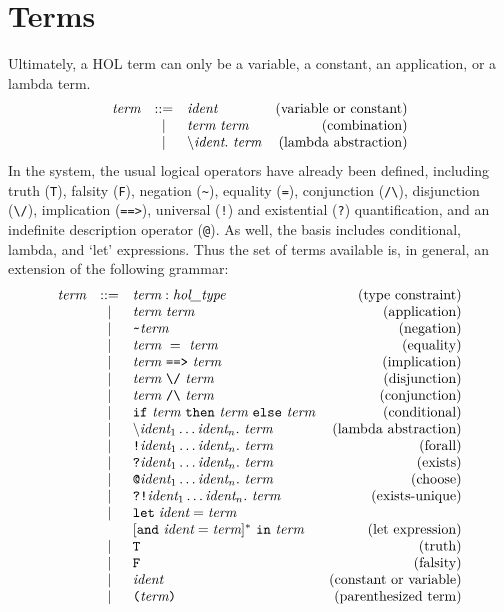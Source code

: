 \documentclass[12pt,fleqn,a4paper]{report}
\makeatletter
\newcommand{\ident}      {\mbox{\it ident}}
\newcommand{\type}       {\mbox{\it hol\_type}}
\newcommand{\term}       {\mbox{\it term}}
\newcommand{\bs}         {\mbox{$\backslash$}}
\newcommand{\IMP}       {\mbox{\tt ==>}}
\newcommand{\LET}       {\mbox{\tt let}}
\newcommand{\IN}       {\mbox{\tt in}}
\newcommand{\und}       {\mbox{\tt and}}
\newcommand{\ALL}       {\mbox{\tt !}}
\newcommand{\EXISTS}       {\mbox{\tt ?}}
\newcommand{\EXISTSONE}       {\mbox{\tt ?!}}
\newcommand{\CHOOSE}       {\mbox{\tt @}}
\makeatother
\begin{document}
\section{Terms}

Ultimately, a HOL term can only be a variable, a constant, an
application, or a lambda term.
\[
\begin{array}{rclr}
  \term & ::= & \ident & \mbox{(variable or constant)} \\
  & | &  \term\  \term & \mbox{(combination)} \\
  & | &  \bs\ident.\  \term &
  \mbox{(lambda abstraction)}
\end{array}
\]
In the system, the usual logical operators have already been defined,
including truth (\verb+T+), falsity (\verb+F+), negation (\verb+~+),
equality (\verb+=+), conjunction (\verb+/\+), disjunction (\verb+\/+),
implication (\verb+==>+), universal (\verb+!+) and existential
(\verb+?+) quantification, and an indefinite description operator
(\verb+@+). As well, the basis includes conditional, lambda, and `let'
expressions. Thus the set of terms available is, in general, an
extension of the following grammar:
\[
\begin{array}{rclr}
  \mbox{\it term} & ::= & \term : \type & \mbox{(type constraint)} \\
  & | & \term\ \term & \mbox{(application)} \\
  & | & \verb+~+ \term & \mbox{(negation)} \\
  & | & \term\ =\ \term & \mbox{(equality)} \\
  & | & \term\ \IMP\ \term & \mbox{(implication)} \\
  & | & \term\ \verb+\/+\ \term & \mbox{(disjunction)} \\
  & | & \term\ \verb+/\+\ \term & \mbox{(conjunction)} \\
  & | & \texttt{if}\ \term\ \texttt{then}\ \term\ \texttt{else}\ \term &
  \mbox{(conditional)} \\
  & | & \bs\ident_1\ldots\ident_n.\  \term & \mbox{(lambda abstraction)} \\
  & | & \ALL \ident_1\ldots\ident_n.\ \term & \mbox{(forall)} \\
  & | & \EXISTS \ident_1\ldots\ident_n.\ \term & \mbox{(exists)} \\
  & | & \CHOOSE \ident_1\ldots\ident_n.\ \term & \mbox{(choose)} \\
  & | & \EXISTSONE \ident_1\ldots\ident_n.\ \term &\mbox{(exists-unique)} \\
  & | & \LET\; \ident = \term  & \\
  &   & [\und\ \ident = \term]^{*}\ \IN\ \term & \mbox{(let expression)} \\
  & | & \verb+T+ & \mbox{(truth)} \\
  & | & \verb+F+ & \mbox{(falsity)} \\
  & | & \ident & \mbox{(constant or variable)} \\
  & | & \verb+(+ \term \verb+)+ & \mbox{(parenthesized term)}
\end{array}
\]
\end{document}
